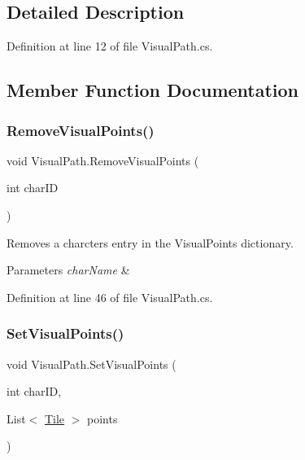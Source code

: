\subsection{Detailed Description}


Definition at line 12 of file Visual\+Path.\+cs.



\subsection{Member Function Documentation}
\mbox{\label{class_visual_path_af955b5b00118a0c87d4e103d3d14e728}} 
\subsubsection{\texorpdfstring{Remove\+Visual\+Points()}{RemoveVisualPoints()}}
{\footnotesize\ttfamily void Visual\+Path.\+Remove\+Visual\+Points (\begin{DoxyParamCaption}\item[{int}]{char\+ID }\end{DoxyParamCaption})}



Removes a charcters entry in the Visual\+Points dictionary. 


\begin{DoxyParams}{Parameters}
{\em char\+Name} & \\
\hline
\end{DoxyParams}


Definition at line 46 of file Visual\+Path.\+cs.

\mbox{\label{class_visual_path_a3f55917f6f07be3a6b431ff81436ef90}} 
\subsubsection{\texorpdfstring{Set\+Visual\+Points()}{SetVisualPoints()}}
{\footnotesize\ttfamily void Visual\+Path.\+Set\+Visual\+Points (\begin{DoxyParamCaption}\item[{int}]{char\+ID,  }\item[{List$<$ \hyperlink{class_tile}{Tile} $>$}]{points }\end{DoxyParamCaption})}



